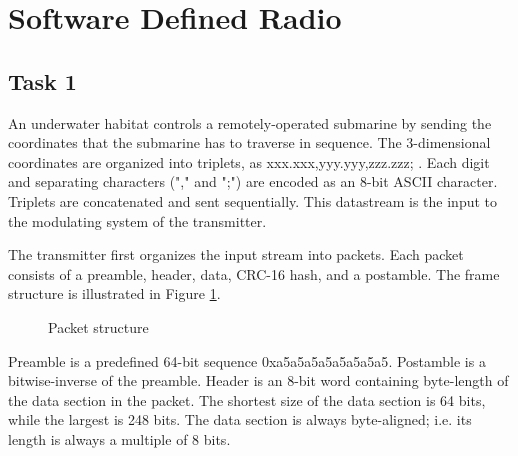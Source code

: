 \documentclass{article}
\begin{document}
\section{Software Defined Radio}

\subsection{Task 1}
An underwater habitat controls a remotely-operated submarine by sending the coordinates that the submarine has to traverse in sequence. The 3-dimensional coordinates are organized into triplets, as \textsf{xxx.xxx,yyy.yyy,zzz.zzz;} . Each digit and separating characters ("\textsf{,}" and "\textsf{;}") are encoded as an 8-bit ASCII character. Triplets are concatenated and sent sequentially. This datastream is the input to the modulating system of the transmitter.

The transmitter first organizes the input stream into packets. Each packet consists of a preamble, header, data, CRC-16 hash, and a postamble. The frame structure is illustrated in Figure \ref{fig:packet}.

\begin{figure}[h!]
\centering
{}
\caption{Packet structure}
\label{fig:packet}
\end{figure}

Preamble is a predefined 64-bit sequence \textsf{0xa5a5a5a5a5a5a5a5}. Postamble is a bitwise-inverse of the preamble. Header is an 8-bit word containing byte-length of the data section in the packet. The shortest size of the data section is 64 bits, while the largest is 248 bits. The data section is always byte-aligned; i.e. its length is always a multiple of 8 bits.
\end{document}
